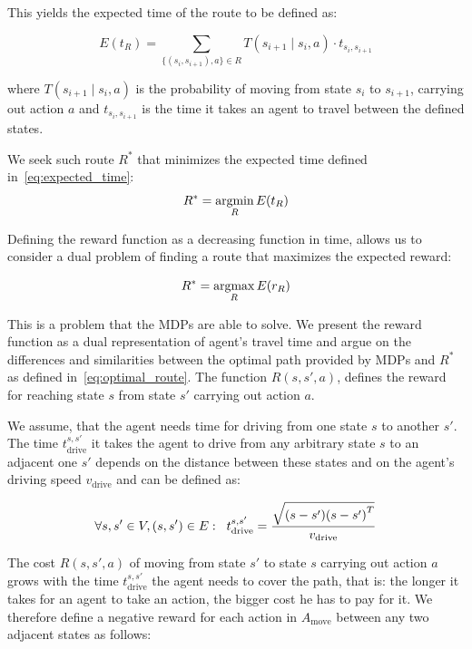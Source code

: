 This yields the expected time of the route to be defined as:

\begin{equation}
\label{eq:expected_time}
E(t_R) = \sum_{\{(s_i, s_{i+1}), a \} \in R} T(s_{i+1} \mid s_i, a) \cdot t_{s_i, s_{i+1}}
\end{equation}

where $T(s_{i+1} \mid s_i, a)$ is the probability of moving from state $s_i$
to $s_{i+1}$, carrying out action $a$ and $t_{s_i, s_{i+1}}$ is the time it
takes an agent to travel between the defined states.

We seek such route $R^*$ that minimizes the expected time defined in~\eqref{eq:expected_time}:
\begin{equation}
\label{eq:optimal_route}
    R^* = \mathop{\rm argmin}_R E(t_R)
\end{equation}

Defining the reward function as a decreasing function in time, allows us to
consider a dual problem of finding a route that maximizes the expected reward:

\begin{equation}
    R^* = \mathop{\rm argmax}_R E(r_R)
\end{equation}

This is a problem that the MDPs are able to solve. We present the reward
function as a dual representation of agent's travel time and argue on the
differences and similarities between the optimal path provided by MDPs and
$R^*$ as defined in~\eqref{eq:optimal_route}. The function $R(s, s', a)$,
defines the reward for reaching state $s$ from state $s'$ carrying out action
$a$.

We assume, that the agent needs time for driving from one state $s$ to another
$s'$. The time $t^{s, s'}_\mathrm{drive}$ it takes the agent to drive from any
arbitrary state $s$ to an adjacent one $s'$ depends on the distance between
these states and on the agent's driving speed $v_{\mathrm{drive}}$ and can be
defined as:

\begin{equation}
\label{eq:time_to_drive}
\forall s,s' \in V, (s, s') \in E: \hspace{2mm} t_{\mathrm{drive}}^{s,s'}
= \frac{\sqrt{(s - s') {(s - s')}^T}}{v_{\mathrm{drive}}}
\end{equation}

The cost $R(s, s', a)$ of moving from state $s'$ to state $s$ carrying out
action $a$ grows with the time $t_{\mathrm{drive}}^{s,s'}$ the agent needs to
cover the path, that is: the longer it takes for an agent to take an action,
the bigger cost he has to pay for it. We therefore define a negative reward
for each action in $A_{\mathrm{move}}$ between any two adjacent states as
follows:

